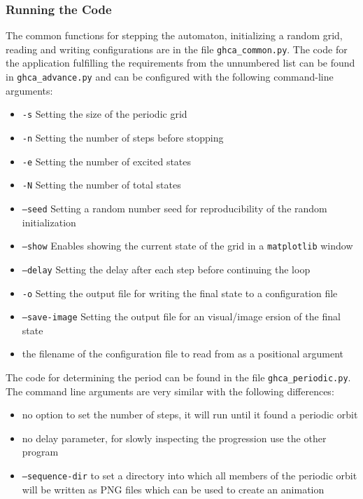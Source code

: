 \subsubsection{Running the Code}
The common functions for stepping the automaton, initializing a random grid, reading and writing configurations are in the file \texttt{ghca\_common.py}.
The code for the application fulfilling the requirements from the unnumbered list can be found in \texttt{ghca\_advance.py} and can be configured with the following command-line arguments:
\begin{itemize}
	\item \texttt{-s} Setting the size of the periodic grid
	\item \texttt{-n} Setting the number of steps before stopping
	\item \texttt{-e} Setting the number of excited states
	\item \texttt{-N} Setting the number of total states
	\item \texttt{--seed} Setting a random number seed for reproducibility of the random initialization
	\item \texttt{--show} Enables showing the current state of the grid in a \texttt{matplotlib} window
	\item \texttt{--delay} Setting the delay after each step before continuing the loop
	\item \texttt{-o} Setting the output file for writing the final state to a configuration file
	\item \texttt{--save-image} Setting the output file for an visual/image ersion of the final state
	\item the filename of the configuration file to read from as a positional argument
\end{itemize}
The code for determining the period can be found in the file \texttt{ghca\_periodic.py}.
The command line arguments are very similar with the following differences:
\begin{itemize}
	\item no option to set the number of steps, it will run until it found a periodic orbit
	\item no delay parameter, for slowly inspecting the progression use the other program
	\item \texttt{--sequence-dir} to set a directory into which all members of the periodic orbit will be written as PNG files which can be used to create an animation
\end{itemize}